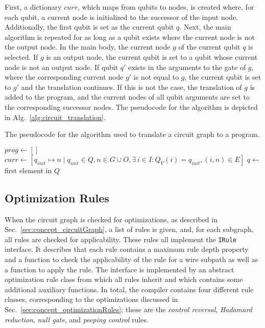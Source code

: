 First, a dictionary $curr$, which maps from qubits to nodes, is created where, for each qubit, a current node is initialized to the successor of the input node. Additionally, the first qubit is set as the current qubit $q$. Next, the main algorithm is repeated for as long as a qubit exists where the current node is not the output node. In the main body, the current node $g$ of the current qubit $q$ is selected. If $g$ is an output node, the current qubit is set to a qubit whose current node is not an output node. If qubit $q'$ exists in the arguments to the gate of $g$, where the corresponding current node $g'$ is not equal to $g$, the current qubit is set to $g'$ and the translation continues. If this is not the case, the translation of $g$ is added to the program, and the current nodes of all qubit arguments are set to the corresponding successor nodes. The pseudocode for the algorithm is depicted in Alg.~\ref{alg:circuit_translation}.

\begin{algorithm}
    \caption{The pseudocode for the algorithm used to translate a circuit graph to a program.}
    \label{alg:circuit_translation}
    $prog \gets []$\;
    $curr \gets [q_{init} \mapsto n \mid q_{init} \in Q, n \in G \cup O, \exists \ i \in I : Q_V(i) = q_{init}, (i, n) \in E]$\;
    $q \gets$ first element in $Q$\; 
\end{algorithm}

\subsection{Optimization Rules}
When the circuit graph is checked for optimizations, as described in Sec.~\ref{sec:concept_circuitGraph}, a list of rules is given, and, for each subgraph, all rules are checked for applicability. These rules all implement the \texttt{IRule} interface. It describes that each rule contains a maximum rule depth property and a function to check the applicability of the rule for a wire subpath as well as a function to apply the rule. The interface is implemented by an abstract optimization rule class from which all rules inherit and which contains some additional auxiliary functions. In total, the compiler contains four different rule classes, corresponding to the optimizations discussed in Sec.~\ref{sec:concept_optimizationRules}; these are the \emph{control reversal}, \emph{Hadamard reduction}, \emph{null gate}, and \emph{peeping control} rules.

